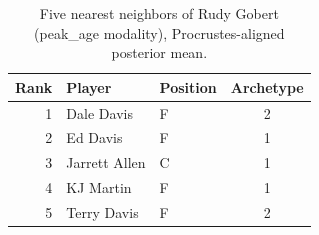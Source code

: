 \begin{table}[htbp]
  \centering\small
  \begin{tabular}{rllc}
    \toprule
    Rank & Player & Position & Archetype \\
    \midrule
    1 & Dale Davis & F & 2 \\
    2 & Ed Davis & F & 1 \\
    3 & Jarrett Allen & C & 1 \\
    4 & KJ Martin & F & 1 \\
    5 & Terry Davis & F & 2 \\
    \bottomrule
  \end{tabular}
  \caption{Five nearest neighbors of Rudy Gobert (peak_age modality), Procrustes-aligned posterior mean.}
  \label{tab:Rudy_Gobert_neighbors_peak_age}
\end{table}

